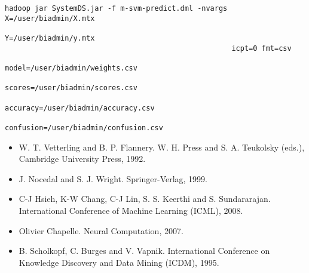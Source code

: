 \begin{verbatim}
hadoop jar SystemDS.jar -f m-svm-predict.dml -nvargs X=/user/biadmin/X.mtx 
                                                     Y=/user/biadmin/y.mtx 
                                                     icpt=0 fmt=csv
                                                     model=/user/biadmin/weights.csv
                                                     scores=/user/biadmin/scores.csv
                                                     accuracy=/user/biadmin/accuracy.csv
                                                     confusion=/user/biadmin/confusion.csv
\end{verbatim}


\begin{itemize}
\item W. T. Vetterling and B. P. Flannery.  \newblock W. H. Press and S. A. Teukolsky
(eds.), Cambridge University Press, 1992.
\item J. Nocedal and  S. J. Wright.  \newblock Springer-Verlag, 1999.
\item C-J Hsieh, K-W Chang, C-J Lin, S. S. Keerthi and S. Sundararajan.  \newblock International Conference of Machine Learning
(ICML), 2008.
\item Olivier Chapelle.  \newblock Neural 
Computation, 2007.
\item B. Scholkopf, C. Burges and V. Vapnik.  \newblock International Conference on Knowledge Discovery and Data Mining (ICDM), 1995.
\end{itemize}

